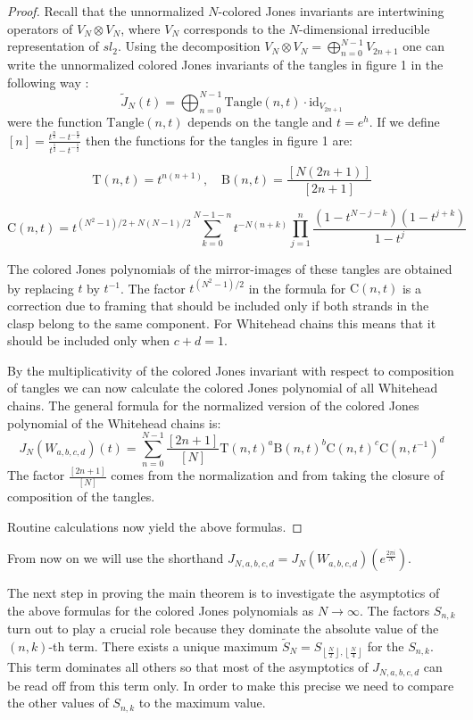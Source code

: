 \documentclass[letterpaper]{article}
\begin{document}
\begin{proof}
Recall that the unnormalized $N$-colored Jones invariants are
intertwining operators of $V_N\otimes V_N$, where $V_N$
corresponds to the $N$-dimensional irreducible
representation of $sl_2$. Using the decomposition $V_N\otimes V_N
= \bigoplus_{n=0}^{N-1}V_{2n+1}$ one can write the unnormalized
colored Jones invariants of the tangles in figure 1 in the
following way \cite{HaoZheng}:
$$\tilde{J}_N(t)=\bigoplus_{n=0}^{N-1}
\mathrm{Tangle}(n,t)\cdot\mathrm{id}_{V_{2n+1}}$$ were the
function $\mathrm{Tangle}(n,t)$ depends on the tangle and
$t=e^{h}$. If we define $[n] =
\frac{t^{\frac{n}{2}}-t^{-\frac{n}{2}}}{t^{\frac{1}{2}}-t^{-\frac{1}{2}}}$
then the functions for the tangles in figure 1 are:

$$\mathrm{T}(n,t) =  t^{n(n+1)},\quad \mathrm{B}(n,t) =  \frac{[N(2n+1)]}{[2n+1]}$$

$$\mathrm{C}(n,t) =  t^{(N^2-1)/2+N(N-1)/2}\sum_{k=0}^{N-1-n}t^{-N(n+k)}\prod_{j=1}^n\frac{(1-t^{N-j-k})(1-t^{j+k})}{1-t^{j}}$$

\noindent The colored Jones polynomials of the mirror-images of these tangles are obtained by replacing $t$ by $t^{-1}$.
The factor $t^{(N^2-1)/2}$ in the formula for $\mathrm{C}(n,t)$ is a correction due to framing that should be included only if both strands in the clasp belong to the same component. For Whitehead chains this means that it should be included only when $c+d = 1$.

By the multiplicativity of the colored Jones invariant with
respect to composition of tangles we can now calculate the colored
Jones polynomial of all Whitehead chains. The general formula for
the normalized version of the colored Jones polynomial of the
Whitehead chains is:
$$J_N(W_{a,b,c,d})(t) = \sum_{n=0}^{N-1}\frac{[2n+1]}{[N]}\mathrm{T}(n,t)^a\mathrm{B}(n,t)^b\mathrm{C}(n,t)^c\mathrm{C}(n,t^{-1})^d$$
The factor $\frac{[2n+1]}{[N]}$ comes from the normalization and from
taking the closure of composition of the tangles.

Routine calculations now yield the above formulas.
\end{proof}

\noindent From now on we will use the shorthand $J_{N,a,b,c,d} =
J_N(W_{a,b,c,d})(e^{\frac{2\pi i}{N}})$.

The next step in proving the main theorem is to investigate the
asymptotics of the above formulas for the colored Jones polynomials
as $N\to \infty$. The factors $S_{n,k}$ turn out to play a crucial
role because they dominate the absolute value of the $(n,k)$-th
term. There exists a unique maximum $\tilde{S}_N =
S_{\left\lfloor\frac{N}{2}\right\rfloor,\left\lfloor\frac{N}{4}\right\rfloor}$
for the $S_{n,k}$. This term dominates all others
so that most of the asymptotics of $J_{N,a,b,c,d}$ can be read off
from this term only. In order to make this precise we need to
compare the other values of $S_{n,k}$ to the maximum value.
\end{document}

